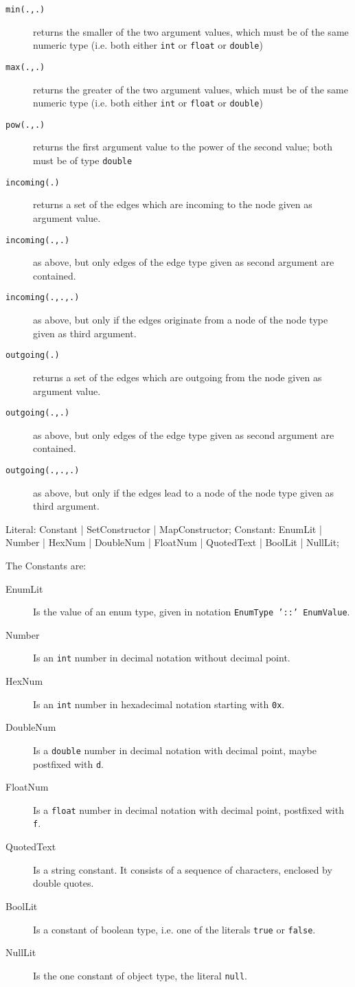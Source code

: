 \begin{description}
\item[\texttt{min(.,.)}] returns the smaller of the two argument values, which must be of the same numeric type (i.e. both either \texttt{int} or \texttt{float} or \texttt{double})
\item[\texttt{max(.,.)}] returns the greater of the two argument values, which must be of the same numeric type (i.e. both either \texttt{int} or \texttt{float} or \texttt{double})
\item[\texttt{pow(.,.)}] returns the first argument value to the power of the second value; both must be of type \texttt{double}
\item[\texttt{incoming(.)}] returns a set of the edges which are incoming to the node given as argument value.
\item[\texttt{incoming(.,.)}] as above, but only edges of the edge type given as second argument are contained.
\item[\texttt{incoming(.,.,.)}] as above, but only if the edges originate from a node of the node type given as third argument.
\item[\texttt{outgoing(.)}] returns a set of the edges which are outgoing from the node given as argument value.
\item[\texttt{outgoing(.,.)}] as above, but only edges of the edge type given as second argument are contained.
\item[\texttt{outgoing(.,.,.)}] as above, but only if the edges lead to a node of the node type given as third argument.
\end{description}

\begin{rail}
  Literal: Constant | SetConstructor | MapConstructor;
  Constant: EnumLit | Number | HexNum | DoubleNum | FloatNum | QuotedText | BoolLit | NullLit;
\end{rail}

The Constants are:
\begin{description}
  \item[EnumLit] Is the value of an enum type, given in notation \texttt{EnumType '::' EnumValue}.
  \item[Number] Is an \texttt{int} number in decimal notation without decimal point.
  \item[HexNum] Is an \texttt{int} number in hexadecimal notation starting with \texttt{0x}.
  \item[DoubleNum] Is a \texttt{double} number in decimal notation with decimal point, maybe postfixed with \texttt{d}.
  \item[FloatNum] Is a \texttt{float} number in decimal notation with decimal point, postfixed with \texttt{f}.
  \item[QuotedText] Is a string constant. It consists of a sequence of characters, enclosed by double quotes.
  \item[BoolLit] Is a constant of boolean type, i.e. one of the literals \texttt{true} or \texttt{false}.
  \item[NullLit] Is the one constant of object type, the literal \texttt{null}.
\end{description}

